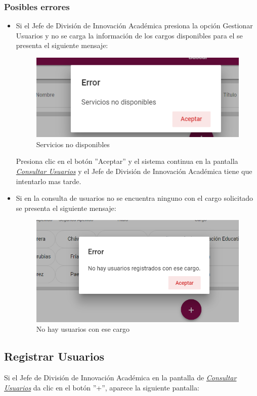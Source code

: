 \subsubsection{Posibles errores}
\begin{itemize}
	\item Si el Jefe de División de Innovación Académica   presiona la opción Gestionar Usuarios y no se carga la información de los cargos disponibles para el se presenta el siguiente mensaje:
	
	\begin{figure}[H]
		\centering
		\includegraphics[width=0.4\linewidth]{images/SP5/MSGSN}
		\caption{Servicios no disponibles}
		\label{SND}
		
	\end{figure}
	
	Presiona clic en el botón ''Aceptar'' y  el sistema continua en la pantalla  \hyperlink{consultarUs}{\textit{Consultar Usuarios}} y el Jefe de División de Innovación Académica  tiene que intentarlo  mas tarde.
	
	\item Si en la consulta de usuarios no se encuentra ninguno con el cargo solicitado se presenta el siguiente mensaje:
	\begin{figure}[H]
		\centering
		\includegraphics[width=0.4\linewidth]{images/SP5/MSG21}
		\caption{No hay usuarios con ese cargo}
		\label{mensaje21}
	\end{figure}
	
\end{itemize}


\newpage
\hypertarget{registrarUs}{}
\subsection{Registrar Usuarios}
Si el Jefe de División de Innovación Académica   en la pantalla de \hyperlink{consultarUs}{\textit{Consultar Usuarios}} da clic en el botón ''+'', aparece la siguiente pantalla:

